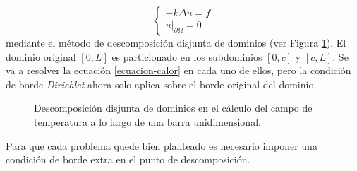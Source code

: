 \begin{equation}
\left\{\begin{matrix}
-k \Delta u=f \\
\left.u\right|_{\partial\Omega}=0
\end{matrix}\right.
\label{ecuacion-calor}
\end{equation}
mediante el método de descomposición disjunta de dominios (ver Figura \ref{temp-ej}). El dominio original $[0,L]$ es particionado en los subdominios $[0,c]$ y $[c,L]$. Se va a resolver la ecuación  \ref{ecuacion-calor} en cada uno de ellos, pero la condición de borde \textit{Dirichlet} ahora solo aplica sobre el borde original del dominio.
\begin{figure}
\centering{}
\caption[Descomposición en barra unidimensional]{Descomposición disjunta de dominios en el cálculo del campo de temperatura a lo largo de una barra unidimensional.}
\label{temp-ej}
\end{figure}
Para que cada problema quede bien planteado es necesario imponer una condición de borde extra en el punto de descomposición.
